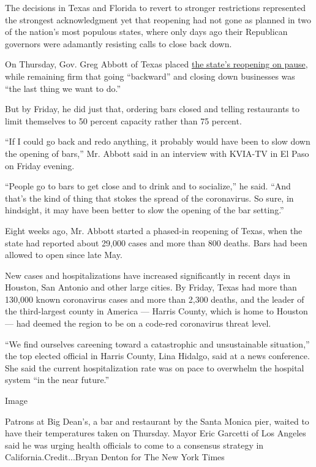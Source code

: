 The decisions in Texas and Florida to revert to stronger restrictions
represented the strongest acknowledgment yet that reopening had not gone
as planned in two of the nation's most populous states, where only days
ago their Republican governors were adamantly resisting calls to close
back down.

On Thursday, Gov. Greg Abbott of Texas placed
\href{https://www.nytimes.com/2020/06/25/us/texas-coronavirus-cases-reopening-Greg-Abbott.html}{the
state's reopening on pause}, while remaining firm that going
``backward'' and closing down businesses was ``the last thing we want to
do.''

But by Friday, he did just that, ordering bars closed and telling
restaurants to limit themselves to 50 percent capacity rather than 75
percent.

``If I could go back and redo anything, it probably would have been to
slow down the opening of bars,'' Mr. Abbott said in an interview with
KVIA-TV in El Paso on Friday evening.

``People go to bars to get close and to drink and to socialize,'' he
said. ``And that's the kind of thing that stokes the spread of the
coronavirus. So sure, in hindsight, it may have been better to slow the
opening of the bar setting.''

Eight weeks ago, Mr. Abbott started a phased-in reopening of Texas, when
the state had reported about 29,000 cases and more than 800 deaths. Bars
had been allowed to open since late May.

New cases and hospitalizations have increased significantly in recent
days in Houston, San Antonio and other large cities. By Friday, Texas
had more than 130,000 known coronavirus cases and more than 2,300
deaths, and the leader of the third-largest county in America --- Harris
County, which is home to Houston --- had deemed the region to be on a
code-red coronavirus threat level.

``We find ourselves careening toward a catastrophic and unsustainable
situation,'' the top elected official in Harris County, Lina Hidalgo,
said at a news conference. She said the current hospitalization rate was
on pace to overwhelm the hospital system ``in the near future.''

Image

Patrons at Big Dean's, a bar and restaurant by the Santa Monica pier,
waited to have their temperatures taken on Thursday. Mayor Eric Garcetti
of Los Angeles said he was urging health officials to come to a
consensus strategy in California.Credit...Bryan Denton for The New York
Times

